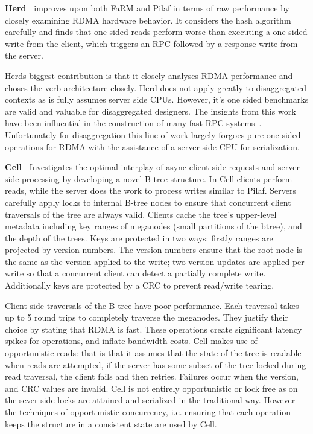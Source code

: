 \textbf{Herd~\cite{herd}} improves upon both FaRM and Pilaf in terms of raw
performance by closely examining RDMA hardware behavior. It considers the hash
algorithm carefully and finds that one-sided reads perform worse than executing
a one-sided write from the client, which triggers an RPC followed by a response
write from the server.

Herds biggest contribution is that it closely analyses RDMA performance and
choses the verb architecture closely. Herd does not apply greatly to
disaggregated contexts as is fully assumes server side CPUs. However, it's one
sided benchmarks are valid and valuable for disaggregated designers. The
insights from this work have been influential in the construction of many fast
RPC systems~\cite{erpc,faast,storm,1rma}. Unfortunately for disaggregation this
line of work largely forgoes pure one-sided operations for RDMA with the
assistance of a server side CPU for serialization.

\textbf{Cell~\cite{cell}} Investigates the optimal interplay of async client
side requests and server-side processing by developing a novel B-tree structure.
In Cell clients perform reads, while the server does the work to process writes
similar to Pilaf.
%
Servers carefully apply locks to internal B-tree nodes to ensure that concurrent
client traversals of the tree are always valid. Clients cache the tree's
upper-level metadata including key ranges of meganodes (small partitions of the
btree), and the depth of the trees.
%
Keys are protected in two ways: firstly ranges are projected by version numbers.
The version numbers ensure that the root node is the same as the version applied
to the write; two version updates are applied per write so that a concurrent
client can detect a partially complete write. Additionally keys are protected by
a CRC to prevent read/write tearing.

Client-side traversals of the B-tree have poor performance. Each traversal takes
up to 5 round trips to completely traverse the meganodes. They justify their
choice by stating that RDMA is fast. These operations create significant latency
spikes for operations, and inflate bandwidth costs.
%
Cell makes use of opportunistic reads: that is that it assumes that the state of
the tree is readable when reads are attempted, if the server has some subset of
the tree locked during read traversal, the client fails and then retries.
Failures occur when the version, and CRC values are invalid. Cell is not
entirely opportunistic or lock free as on the sever side locks are attained and
serialized in the traditional way. However the techniques of opportunistic
concurrency, i.e. ensuring that each operation keeps the structure in a
consistent state are used by Cell.



